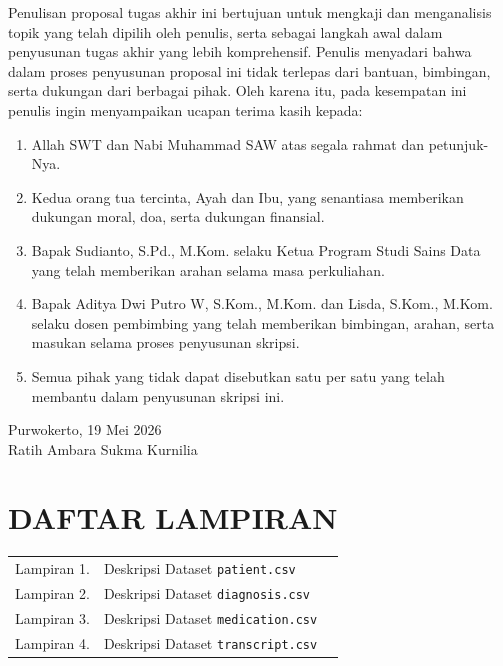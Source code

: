 Penulisan proposal tugas akhir ini bertujuan untuk mengkaji dan menganalisis topik yang telah dipilih oleh penulis, serta sebagai langkah awal dalam penyusunan tugas akhir yang lebih komprehensif. Penulis menyadari bahwa dalam proses penyusunan proposal ini tidak terlepas dari bantuan, bimbingan, serta dukungan dari berbagai pihak. Oleh karena itu, pada kesempatan ini penulis ingin menyampaikan ucapan terima kasih kepada:
\begin{enumerate}
\item Allah SWT dan Nabi Muhammad SAW atas segala rahmat dan petunjuk-Nya.
\item Kedua orang tua tercinta, Ayah dan Ibu, yang senantiasa memberikan dukungan moral, doa, serta dukungan finansial.
\item Bapak Sudianto, S.Pd., M.Kom. selaku Ketua Program Studi Sains Data yang telah memberikan arahan selama masa perkuliahan.
\item Bapak Aditya Dwi Putro W, S.Kom., M.Kom. dan Lisda, S.Kom., M.Kom. selaku dosen pembimbing yang telah memberikan bimbingan, arahan, serta masukan selama proses penyusunan skripsi.
\item Semua pihak yang tidak dapat disebutkan satu per satu yang telah membantu dalam penyusunan skripsi ini.
\end{enumerate}

\begin{flushright}
Purwokerto, 19 Mei 2026\\[1.5cm]
Ratih Ambara Sukma Kurnilia
\end{flushright}

\clearpage
\tableofcontents
\clearpage
\listoffigures
{}
\clearpage
\listoftables
{}
\clearpage
\chapter*{DAFTAR LAMPIRAN}
\begin{tabularx}{\textwidth}{@{}lXr@{}}
Lampiran 1. & Deskripsi Dataset \texttt{patient.csv} & \pageref{app:patient}\\
Lampiran 2. & Deskripsi Dataset \texttt{diagnosis.csv} & \pageref{app:diagnosis}\\
Lampiran 3. & Deskripsi Dataset \texttt{medication.csv} & \pageref{app:medication}\\
Lampiran 4. & Deskripsi Dataset \texttt{transcript.csv} & \pageref{app:transcript}
\end{tabularx}
\clearpage
